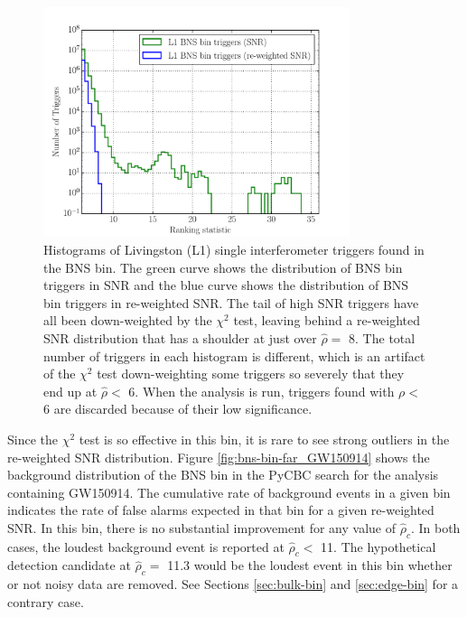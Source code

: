 \begin{figure}[ht!]%
\centering
  \includegraphics[width=0.8\textwidth]{figures/o1-cbc-dq-paper/bns-bin-newsnr-snr-comparison}
  \caption[Histogram of BNS bin triggers]{Histograms of Livingston (L1) single interferometer triggers found in the BNS bin. %
           The green curve shows the distribution of BNS bin triggers in SNR and the blue %
           curve shows the distribution of BNS bin triggers in %
           re-weighted SNR. The tail of high SNR triggers have all been down-weighted by the %
           $\chi^2$ test, leaving behind a re-weighted SNR distribution that has a shoulder %
           at just over $\hat{\rho} =$ 8. The total number of triggers in each histogram is %
           different, which is an artifact of the $\chi^2$ test down-weighting some triggers so %
           severely that they end up at $\hat{\rho} <$ 6. When the analysis is run, triggers %
           found with $\rho <$ 6 are discarded because of their low significance.}
  \label{fig:bns-snr-newsnr}
\end{figure}

Since the $\chi^{2}$ test is so effective in this bin, it is rare to see strong outliers in
the re-weighted SNR distribution.
Figure \ref{fig:bns-bin-far_GW150914} shows the background distribution of the BNS bin in the
PyCBC search for the analysis containing GW150914.
The cumulative rate of background events in a given bin
indicates the rate of false alarms expected in that bin for a given re-weighted SNR. In this bin,
there is no substantial improvement for any value of $\hat{\rho}_{c}$.
In both cases, the loudest background event is reported at $\hat{\rho}_{c} <$ 11.
The hypothetical detection candidate at $\hat{\rho}_{c} =$ 11.3 would be the loudest
event in this bin whether or not noisy data are removed. See Sections \ref{sec:bulk-bin} and
\ref{sec:edge-bin} for a contrary case.

